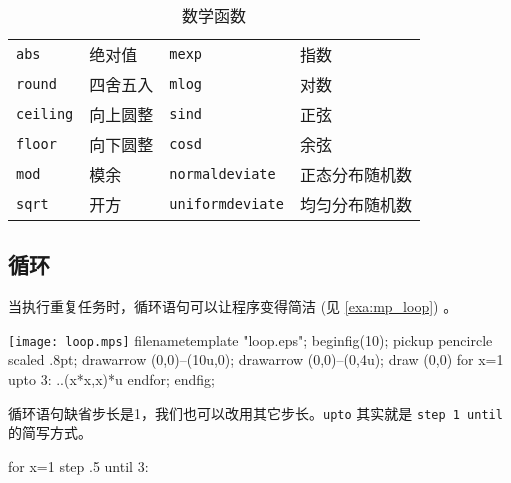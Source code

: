 \begin{table}[htbp]
\centering
\caption{\MP 数学函数}
\label{tab:mp_math_func}
\begin{tabular}{llll}
  \toprule
  \texttt{abs}     & 绝对值   & \texttt{mexp} & 指数 \\
  \texttt{round}   & 四舍五入 & \texttt{mlog} & 对数 \\
  \texttt{ceiling} & 向上圆整 & \texttt{sind} & 正弦 \\
  \texttt{floor}   & 向下圆整 & \texttt{cosd} & 余弦 \\
  \texttt{mod}     & 模余     & \texttt{normaldeviate} & 正态分布随机数 \\
  \texttt{sqrt}    & 开方     & \texttt{uniformdeviate} & 均匀分布随机数 \\
  \bottomrule
\end{tabular}
\end{table}

\subsection{循环}

当执行重复任务时，循环语句可以让程序变得简洁 (见 \autoref{exa:mp_loop}) 。

\begin{example}[h]
\begin{FBTDemo}[numbers=left]{\texttt{[image: loop.mps]}}
filenametemplate "loop.eps";
beginfig(10);
pickup pencircle scaled .8pt;
drawarrow (0,0)--(10u,0);
drawarrow (0,0)--(0,4u);
draw (0,0) %
for x=1 upto 3: ..(x*x,x)*u endfor;
endfig;
\end{FBTDemo}
\caption{\MP 循环}
\label{exa:mp_loop}
\end{example}

循环语句缺省步长是1，我们也可以改用其它步长。\texttt{upto} 其实就是 \texttt{step 1 until} 的简写方式。

\begin{Code}[]
for x=1 step .5 until 3: 
\end{Code}



